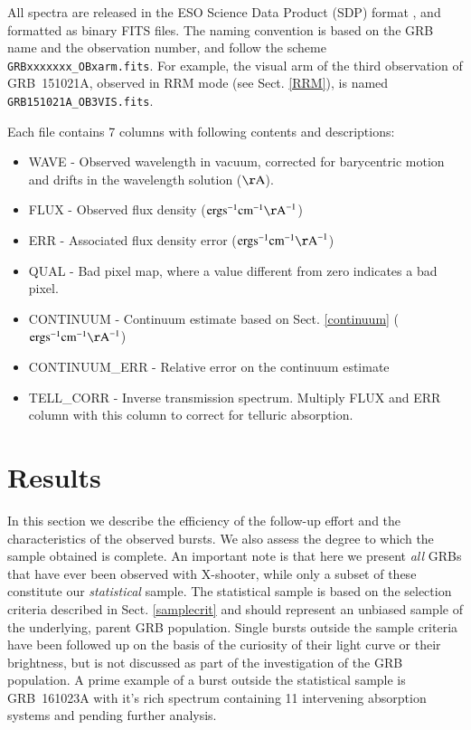 \documentclass{aa}    %
\begin{document}
All spectra are released in the ESO Science Data Product (SDP) format
\citep{Micol2016}, and formatted as binary FITS files. The naming convention is
based on the GRB name and the observation number, and follow the scheme
\texttt{GRBxxxxxxx\_OBxarm.fits}. For example, the visual arm of the third
observation of GRB~151021A, observed in RRM mode (see Sect. \ref{RRM}), is named
\texttt{GRB151021A\_OB3VIS.fits}.

Each file contains 7 columns with following contents and descriptions:
\begin{itemize}
	\item WAVE - Observed wavelength in vacuum, corrected for barycentric motion and drifts in the wavelength solution ($\mathrm{\AA}$).
	\item FLUX - Observed flux density ($\mathrm{erg} \mathrm{s}^{-1} \mathrm{cm}^{-1} \mathrm{\AA}^{-1}$)
	\item ERR - Associated flux density error ($\mathrm{erg} \mathrm{s}^{-1} \mathrm{cm}^{-1} \mathrm{\AA}^{-1}$)
	\item QUAL - Bad pixel map, where a value different from zero indicates a bad pixel.
	\item CONTINUUM - Continuum estimate based on Sect. \ref{continuum} ($\mathrm{erg} \mathrm{s}^{-1} \mathrm{cm}^{-1} \mathrm{\AA}^{-1}$)
	\item CONTINUUM\_ERR - Relative error on the continuum estimate 
	\item TELL\_CORR - Inverse transmission spectrum. Multiply FLUX and ERR column with this column to correct for telluric absorption. 
\end{itemize}




\section{Results} \label{results}

In this section we describe the efficiency of the follow-up effort and the
characteristics of the observed bursts. We also assess the degree to which the
sample obtained is complete. An important note is that here we present
\textit{all} GRBs that have ever been observed with X-shooter, while only a
subset of these constitute our \textit{statistical} sample. The statistical
sample is based on the selection criteria described in Sect. \ref{samplecrit}
and should represent an unbiased sample of the underlying, parent GRB
population. Single bursts outside the sample criteria have been followed up on
the basis of the curiosity of their light curve or their brightness, but is not
discussed as part of the investigation of the GRB population. A prime example of
a burst outside the statistical sample is GRB~161023A with it's rich
spectrum containing 11 intervening absorption systems and pending further analysis. 
\end{document}
